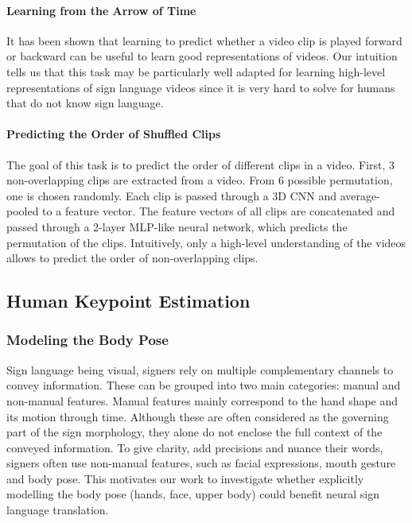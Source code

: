 \documentclass[final]{cvpr}
\begin{document}
\paragraph{Learning from the Arrow of Time}
It has been shown \cite{arrow} that learning to predict whether a video clip is played forward or backward can be useful to learn good representations of videos. Our intuition tells us that this task may be particularly well adapted for learning high-level representations of sign language videos since it is very hard to solve for humans that do not know sign language.
\paragraph{Predicting the Order of Shuffled Clips}
The goal of this task is to predict the order of different clips in a video. First, 3 non-overlapping clips are extracted from a video. From 6 possible permutation, one is chosen randomly. Each clip is passed through a 3D CNN and average-pooled to a feature vector. The feature vectors of all clips are concatenated and passed through a 2-layer MLP-like neural network, which predicts the permutation of the clips. Intuitively, only a high-level understanding of the videos allows to predict the order of non-overlapping clips.
\subsection{Human Keypoint Estimation}
\subsubsection{Modeling the Body Pose}
Sign language being visual, signers rely on multiple complementary channels to convey information. These can be grouped into two main categories: manual and non-manual features. Manual features mainly correspond to the hand shape and its motion through time. Although these are often considered as the governing part of the sign morphology, they alone do not enclose the full context of the conveyed information. To give clarity, add precisions and nuance their words, signers often use non-manual features, such as facial expressions, mouth gesture and body pose. This motivates our work to investigate whether explicitly modelling the body pose (hands, face, upper body) could benefit neural sign language translation.
\end{document}
